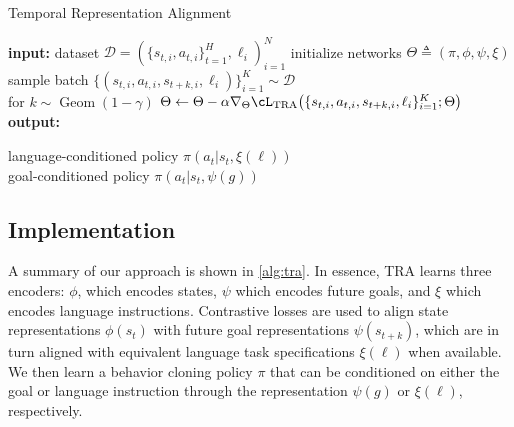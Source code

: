 \begin{algorithm}
    \caption{Temporal Representation Alignment}
    \label{alg:tra}
    \begin{algorithmic}[1]
        \State \textbf{input:} dataset $\mathcal{D} = (\{s_{t,i},a_{t,i}\}_{t=1}^{H},\ell_i)_{i=1}^N$
        \State initialize networks $\Theta \triangleq (\pi,\phi,\psi,\xi)$
        \State sample batch $\bigl\{(s_{t,i},a_{t,i},s_{t+k,i},\ell_i)\bigr\}_{i=1}^K\sim\mathcal{D}$ \\
        \hspace*{2ex} for $k\sim\operatorname{Geom}(1-\gamma)$
        \State $\Theta \gets \Theta - \alpha \nabla_{\Theta} \cL_{\text{TRA}}\bigl(\{s_{t,i},a_{t,i},s_{t+k,i},\ell_i\}_{i=1}^K; \Theta\bigr)$
        \EndWhile
        \smallskip
        \State \textbf{output:} \parbox[t]{\linewidth}{language-conditioned policy $\pi(a_{t} | s_{t}, \xi(\ell))$ \\
            goal-conditioned policy $\pi(a_{t} | s_{t}, \psi(g))$
        }
    \end{algorithmic}
\end{algorithm}

\subsection{Implementation}
\label{sec:implementation}

A summary of our approach is shown in \cref{alg:tra}.
In essence, TRA learns three encoders: $\phi$, which encodes states, $\psi$ which encodes future goals, and $\xi$ which encodes language instructions.
Contrastive losses are used to align state representations $\phi(s_{t})$ with future goal representations $\psi(s_{t+k})$, which are in turn aligned with equivalent language task specifications $\xi(\ell)$ when available.
We then learn a behavior cloning policy $\pi$ that can be conditioned on either the goal or language instruction through the representation $\psi(g)$ or $\xi(\ell)$, respectively.


